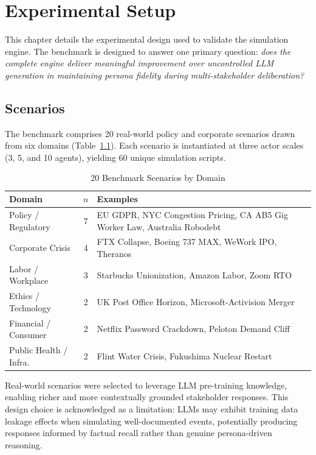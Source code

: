 \chapter{Experimental Setup}

This chapter details the experimental design used to validate the simulation engine. The benchmark is designed to answer one primary question: \textit{does the complete engine deliver meaningful improvement over uncontrolled LLM generation in maintaining persona fidelity during multi-stakeholder deliberation?}


\section{Scenarios}

The benchmark comprises 20 real-world policy and corporate scenarios drawn from six domains (Table~\ref{tab:scenarios}). Each scenario is instantiated at three actor scales (3, 5, and 10 agents), yielding 60 unique simulation scripts.

\begin{table}[t]
\centering
\caption{20 Benchmark Scenarios by Domain}
\label{tab:scenarios}
\begin{tabular}{p{3cm}cp{5cm}}
\toprule
Domain & $n$ & Examples \\
\midrule
Policy / Regulatory    & 7 & EU GDPR, NYC Congestion Pricing, CA AB5 Gig Worker Law, Australia Robodebt \\
Corporate Crisis       & 4 & FTX Collapse, Boeing 737 MAX, WeWork IPO, Theranos \\
Labor / Workplace      & 3 & Starbucks Unionization, Amazon Labor, Zoom RTO \\
Ethics / Technology    & 2 & UK Post Office Horizon, Microsoft-Activision Merger \\
Financial / Consumer   & 2 & Netflix Password Crackdown, Peloton Demand Cliff \\
Public Health / Infra. & 2 & Flint Water Crisis, Fukushima Nuclear Restart \\
\bottomrule
\end{tabular}
\end{table}

Real-world scenarios were selected to leverage LLM pre-training knowledge, enabling richer and more contextually grounded stakeholder responses. This design choice is acknowledged as a limitation: LLMs may exhibit training data leakage effects when simulating well-documented events, potentially producing responses informed by factual recall rather than genuine persona-driven reasoning.

